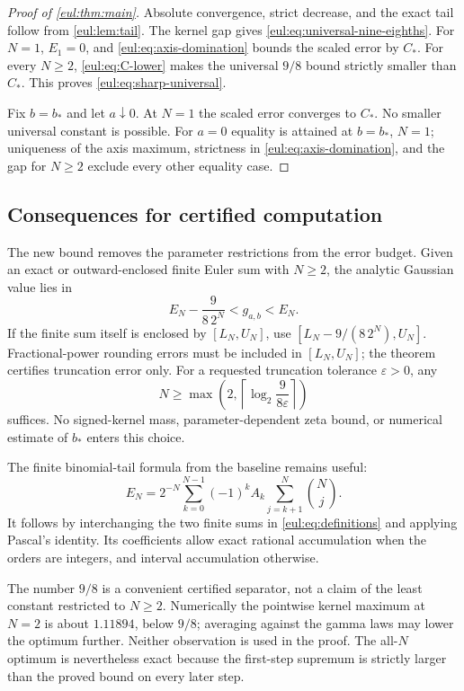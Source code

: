 \begin{proof}[Proof of \cref{eul:thm:main}]
Absolute convergence, strict decrease, and the exact tail follow from
\cref{eul:lem:tail}. The kernel gap gives
\eqref{eul:eq:universal-nine-eighths}. For $N=1$, $E_1=0$, and
\eqref{eul:eq:axis-domination} bounds the scaled error by $C_*$.
For every $N\ge2$, \eqref{eul:eq:C-lower} makes the universal
$9/8$ bound strictly smaller than $C_*$. This proves
\eqref{eul:eq:sharp-universal}.

Fix $b=b_*$ and let $a\downarrow0$. At $N=1$ the scaled error
converges to $C_*$. No smaller universal constant is possible.
For $a=0$ equality is attained at $b=b_*$, $N=1$; uniqueness of
the axis maximum, strictness in \eqref{eul:eq:axis-domination}, and
the gap for $N\ge2$ exclude every other equality case.
\end{proof}

\subsection{Consequences for certified computation}

The new bound removes the parameter restrictions from the error
budget. Given an exact or outward-enclosed finite Euler sum with
$N\ge2$, the analytic Gaussian value lies in
\begin{equation}\label{eul:eq:certified-interval}
 E_N-\frac{9}{8\,2^N}<g_{a,b}<E_N.
\end{equation}
If the finite sum itself is enclosed by $[L_N,U_N]$, use
$[L_N-9/(8\,2^N),U_N]$. Fractional-power rounding errors must be
included in $[L_N,U_N]$; the theorem certifies truncation error only.
For a requested truncation tolerance $\varepsilon>0$, any
\[
 N\ge\max\!\left(2,\left\lceil
         \log_2\frac{9}{8\varepsilon}\right\rceil\right)
\]
suffices. No signed-kernel mass, parameter-dependent zeta bound,
or numerical estimate of $b_*$ enters this choice.

The finite binomial-tail formula from the baseline remains useful:
\begin{equation}\label{eul:eq:finite-weights}
 E_N=2^{-N}\sum_{k=0}^{N-1}(-1)^k A_k
                   \sum_{j=k+1}^{N}\binom Nj.
\end{equation}
It follows by interchanging the two finite sums in
\eqref{eul:eq:definitions} and applying Pascal's identity. Its
coefficients allow exact rational accumulation when the orders are
integers, and interval accumulation otherwise.

\begin{remark}
The number $9/8$ is a convenient certified separator, not a claim
of the least constant restricted to $N\ge2$. Numerically the
pointwise kernel maximum at $N=2$ is about $1.11894$, below $9/8$;
averaging against the gamma laws may lower the optimum further.
Neither observation is used in the proof. The all-$N$ optimum is
nevertheless exact because the first-step supremum is strictly larger
than the proved bound on every later step.
\end{remark}

